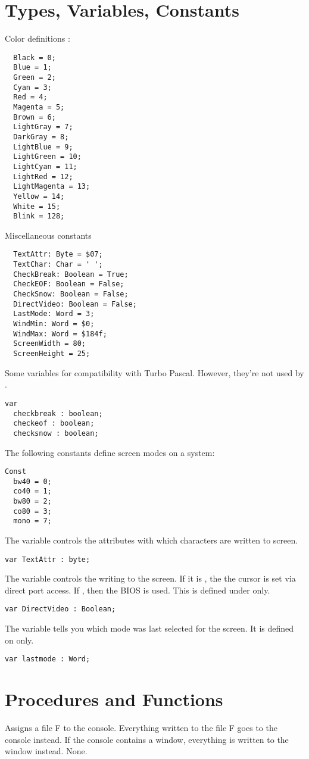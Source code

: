 \section{Types, Variables, Constants}
Color definitions :
\begin{verbatim}
  Black = 0;
  Blue = 1;
  Green = 2;
  Cyan = 3;
  Red = 4;
  Magenta = 5;
  Brown = 6;
  LightGray = 7;
  DarkGray = 8;
  LightBlue = 9;
  LightGreen = 10;
  LightCyan = 11;
  LightRed = 12;
  LightMagenta = 13;
  Yellow = 14;
  White = 15;
  Blink = 128;
\end{verbatim}
Miscellaneous constants
\begin{verbatim}
  TextAttr: Byte = $07;
  TextChar: Char = ' ';
  CheckBreak: Boolean = True;
  CheckEOF: Boolean = False;
  CheckSnow: Boolean = False;
  DirectVideo: Boolean = False;
  LastMode: Word = 3;
  WindMin: Word = $0;
  WindMax: Word = $184f;
  ScreenWidth = 80;
  ScreenHeight = 25;
\end{verbatim}
Some variables for compatibility with Turbo Pascal. However, they're not
used by \fpc.
\begin{verbatim}
var
  checkbreak : boolean;
  checkeof : boolean;
  checksnow : boolean;
\end{verbatim}
The following constants define screen modes on a \dos system:
\begin{verbatim}
Const
  bw40 = 0;
  co40 = 1;
  bw80 = 2;
  co80 = 3;
  mono = 7;
\end{verbatim}
The  variable controls the attributes with which characters
are written to screen.
\begin{verbatim}
var TextAttr : byte;
\end{verbatim}
The  variable controls the writing to the screen. If it is
, the the cursor is set via direct port access. If ,
then the BIOS is used. This is defined under \dos only.
\begin{verbatim}
var DirectVideo : Boolean;
\end{verbatim}
The  variable tells you which mode was last selected for the
screen. It is defined on \dos only.
\begin{verbatim}
var lastmode : Word;
\end{verbatim}

\section{Procedures and Functions}
{
Assigns a file F to the console. Everything written to the file F goes to
the console instead. If the console contains a window, everything is written
to the window instead.
}
{None.}{}

